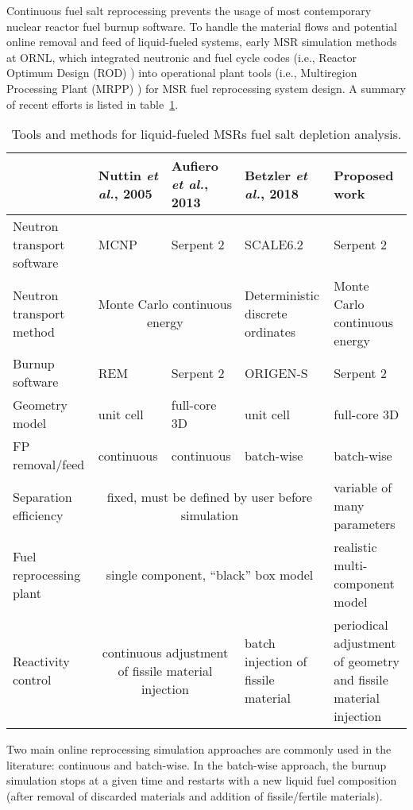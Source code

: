 Continuous fuel salt reprocessing prevents the usage of most contemporary 
nuclear reactor fuel burnup software. To handle the material flows and 
potential online removal and feed of liquid-fueled systems, early \gls{MSR} 
simulation methods at \gls{ORNL}, which integrated neutronic and fuel cycle 
codes (i.e., Reactor Optimum Design (ROD) \cite{bauman_rod_1971}) into 
operational plant tools (i.e., Multiregion Processing Plant (MRPP) 
\cite{kee_mrpp_1976}) for \gls{MSR} fuel reprocessing system design. A summary 
of recent efforts is listed in table~\ref{tab:msr_codes}.
\begin{table}[t]
\fontsize{9}{11}\selectfont
\caption{Tools and methods for liquid-fueled \glspl{MSR} fuel salt depletion 
analysis.}
\begin{tabularx}{\textwidth}{X X X X X} 
\hline 
&Nuttin \emph{et al.}, 2005 \cite{nuttin_potential_2005}& Aufiero \emph{et al.}, 
2013 \cite{aufiero_extended_2013} & Betzler \emph{et al.}, 2018 
\cite{betzler_fuel_2018}&Proposed work \\ [12pt]
\hline
Neutron transport software & \gls{MCNP} & Serpent 2 & SCALE6.2 & Serpent 2 \\ 
[12pt]
Neutron transport method & \multicolumn{2}{c}{Monte Carlo continuous energy} & 
Deterministic discrete ordinates & Monte Carlo continuous energy \\ [12pt]
Burnup software & REM & Serpent 2 & ORIGEN-S & Serpent 2 \\ 
[12pt]
Geometry model & unit cell & full-core 3D & unit cell & full-core 3D\\ [12pt]
\gls{FP} removal/feed  & continuous &continuous & batch-wise & batch-wise\\ 
[12pt]
Separation efficiency &\multicolumn{3}{c}{fixed, must be defined by user 
before simulation} & variable of many parameters \\ [12pt]
Fuel reprocessing plant & \multicolumn{3}{c}{single component, ``black'' box 
model} & realistic multi-component model \\ [12pt]
Reactivity control & \multicolumn{2}{c}{continuous adjustment of fissile 
material injection} & batch injection of fissile material & periodical 
adjustment of geometry and fissile material injection\\
\hline
\end{tabularx}
  \label{tab:msr_codes}
\end{table}

Two main online reprocessing simulation approaches are commonly used in the 
literature: continuous and batch-wise. In the batch-wise approach, the burnup 
simulation stops at a given time and restarts with a new liquid fuel 
composition (after removal of discarded materials and addition of 
fissile/fertile materials). 

